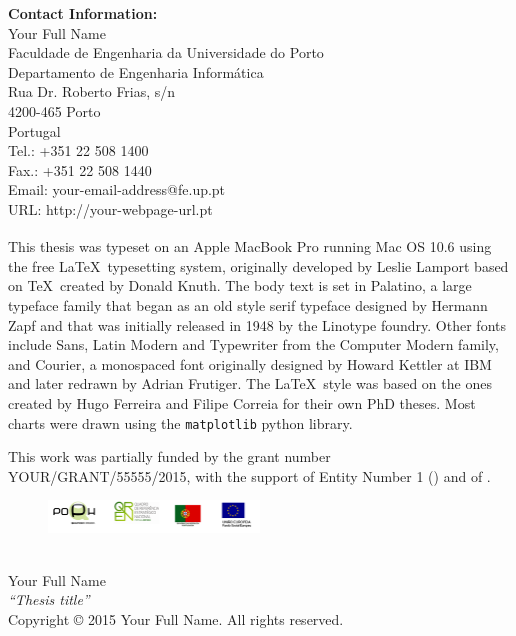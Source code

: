 \noindent\textbf{Contact Information:} \\

\noindent Your Full Name \\
Faculdade de Engenharia da Universidade do Porto \\
Departamento de Engenharia Informática \\

\noindent Rua Dr. Roberto Frias, s/n \\
4200-465 Porto \\
Portugal \\

\noindent Tel.: +351 22 508 1400 \\
Fax.: +351 22 508 1440 \\
Email: your-email-address@fe.up.pt \\
URL: http://your-webpage-url.pt \\

\vfill

{\scriptsize \noindent This thesis was typeset on an Apple\textsuperscript{\textregistered} MacBook\textsuperscript{\textregistered} Pro running Mac OS\textsuperscript{\textregistered} 10.6 using the free \LaTeX~typesetting system, originally developed by Leslie Lamport based on \TeX~created by Donald Knuth. The body text is set in Palatino, a large typeface family that began as an old style serif typeface designed by Hermann Zapf and that was initially released in 1948 by the Linotype foundry. Other fonts include Sans, Latin Modern and Typewriter from the Computer Modern family, and Courier, a monospaced font originally designed by Howard Kettler at IBM and later redrawn by Adrian Frutiger. The \LaTeX~style was based on the ones created by Hugo Ferreira and Filipe Correia for their own PhD theses. Most charts were drawn using the \texttt{matplotlib} python library.} 

\vspace{0.5cm}
{\scriptsize \noindent This work was partially funded by the  grant number \textsc{YOUR/GRANT/55555/2015}, with the support of Entity Number 1 () and of .}
\normalsize

\begin{figure}[hb]
\includegraphics[width=0.5\textwidth]{media/barra-assinaturas-fct}
\end{figure}

\vspace{2.5cm}

\begin{figure}
\centering
\EANisbn
\end{figure}

\normalsize\noindent \null\vspace{0.5mm} \\ 
Your Full Name \\
\emph{``Thesis title''} \\
Copyright © 2015 Your Full Name. All rights reserved.

